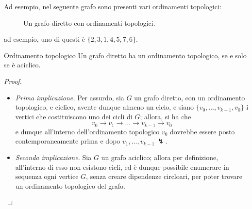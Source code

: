 \documentclass[a4paper, 12pt]{report}
\begin{document}
    \begin{example}
        Ad esempio, nel seguente grafo sono presenti vari ordinamenti topologici:

        \begin{figure}[H]
            \centering
            \caption{Un grafo diretto con ordinamenti topologici.}
        \end{figure}

        ad esempio, uno di questi è $\{2, 3, 1, 4, 5, 7, 6\}$.
    \end{example}

    \begin{framedthm}{Ordinamento topologico}
        \label{Ordinamento topologico}
        Un grafo diretto ha un ordinamento topologico, se e solo se è aciclico.
    \end{framedthm}

    \begin{proof}
        \hspace{0.7cm}
        \begin{itemize}
            \item[] \textit{Prima implicazione.} Per assurdo, sia $G$ un grafo diretto, con un ordinamento topologico, e ciclico, avente dunque almeno un ciclo, e siano $\{v_0, \ldots , v_{k - 1}, v_0\}$ i vertici che costituiscono uno dei cicli di $G$; allora, si ha che $$v_0 \rightarrow v_1 \rightarrow \ldots \rightarrow v_{k - 1} \rightarrow v_0$$ e dunque all'interno dell'ordinamento topologico $v_0$ dovrebbe essere posto contemporaneamente prima e dopo $v_1, \ldots, v_{k - 1} \ \lightning$.
            \item[] \textit{Seconda implicazione.} Sia $G$ un grafo aciclico; allora per definizione, all'interno di esso non esistono cicli, ed è dunque possibile enumerare in sequenza ogni vertice $G$, senza creare dipendenze circloari, per poter trovare un ordinamento topologico del grafo.
        \end{itemize}
    \end{proof}
\end{document}
